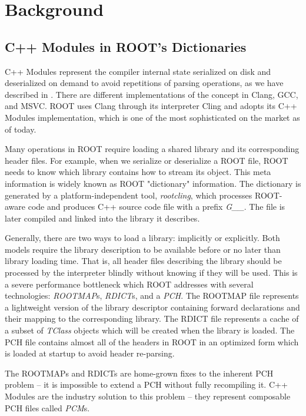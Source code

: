 \documentclass[12pt]{iopart}
\begin{document}
\section{Background}

\subsection{C++ Modules in ROOT's Dictionaries}
\label{intro}

C++ Modules represent the compiler internal state serialized on disk and deserialized on demand to avoid repetitions of parsing operations, as we have described in \cite{chep-modules}. There are different implementations of the concept in Clang, GCC, and MSVC. ROOT uses Clang through its interpreter Cling and adopts its C++ Modules implementation, which is one of the most sophisticated on the market as of today.

Many operations in ROOT require loading a shared library and its corresponding header files. For example, when we serialize or deserialize a ROOT file, ROOT needs to know which library contains how to stream its object. This meta information is widely known as ROOT "dictionary" information. The dictionary is generated by a platform-independent tool, \textit{rootcling}, which processes ROOT-aware code and produces C++ source code file with a prefix \textit{G\_\_}. The file is later compiled and linked into the library it describes.

Generally, there are two ways to load a library: implicitly or explicitly. Both models require the library description to be available before or no later than library loading time. That is, all header files describing the library should be processed by the interpreter blindly without knowing if they will be used. This is a severe performance bottleneck which ROOT addresses with several technologies: \textit{ROOTMAP}s, \textit{RDICT}s, and a \textit{PCH}. The ROOTMAP file represents a lightweight version of the library descriptor containing forward declarations and their mapping to the corresponding library. The RDICT file represents a cache of a subset of \textit{TClass} objects which will be created when the library is loaded. The PCH file contains almost all of the headers in ROOT in an optimized form which is loaded at startup to avoid header re-parsing.

The ROOTMAPs and RDICTs are home-grown fixes to the inherent PCH problem -- it is impossible to extend a PCH without fully recompiling it. C++ Modules are the industry solution to this problem -- they represent composable PCH files called \textit{PCM}s.
\end{document}
